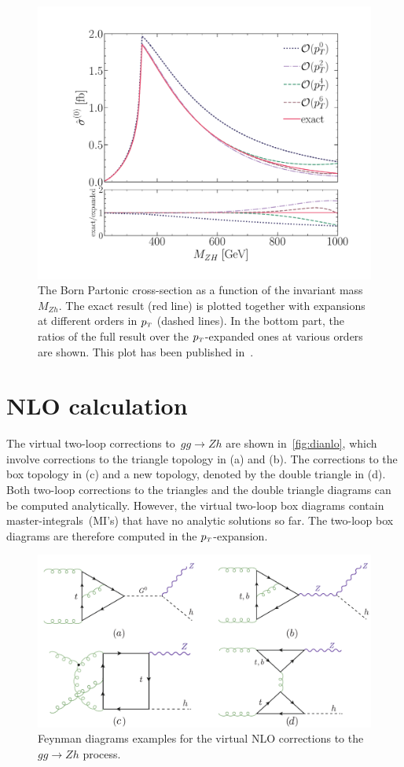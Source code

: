 \begin{figure}[htpb!]
	\centering
	\includegraphics[width=0.75\linewidth]{./figures/LO_ptexp_ratio_1000.pdf}
	\caption{The Born Partonic cross-section
		as a function of the invariant mass $M_{Zh}$.
		The exact result (red line) is plotted together with expansions at
		different orders in $p_{\scriptscriptstyle T}$ (dashed lines). In the bottom part,
		the ratios of the full result over the $p_{\scriptscriptstyle T}$-expanded ones at
		various orders are shown. This plot has been published in~\cite{Alasfar:2021ppe}.}
	\label{fig:LO}
\end{figure}
\section{ NLO calculation }
\label{sec:quattro}
The virtual two-loop corrections to~$ gg\to Zh$ are shown in~\autoref{fig:dianlo}, which involve corrections to the triangle topology in (a) and (b). The corrections to the box topology in (c) and a new topology, denoted by the double triangle in (d). Both two-loop corrections to the triangles and the double triangle diagrams can be computed analytically. However, the virtual two-loop box diagrams contain master-integrals~(MI's) that have no analytic solutions so far. The two-loop box diagrams are therefore computed in the $p_{\scriptscriptstyle T}$-expansion.
\begin{figure}[htpb!]
	\begin{center}
		\includegraphics[width=12cm]{./figures/Feynman_NL0}
		\caption{Feynman diagrams examples for the virtual NLO corrections to the $gg \to Zh$ process. }
		\label{fig:dianlo}
	\end{center}
\end{figure}
